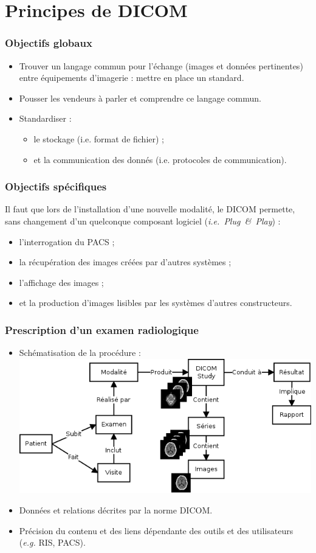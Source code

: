 \section{Principes de DICOM}

	\frame
	{
		\frametitle{Objectifs globaux}
		\begin{itemize}
			\item Trouver un langage commun pour l'\'echange (images et donn\'ees pertinentes) entre \'equipements d'imagerie : mettre en place un standard.
			\item Pousser les vendeurs \`a parler et comprendre ce langage commun.
			\item Standardiser :
			\begin{itemize}
				\item le stockage (i.e. format de fichier) ;
				\item et la communication des donn\'es (i.e. protocoles de communication).
			\end{itemize}
		\end{itemize}
	}
	
	\frame
	{
		\frametitle{Objectifs sp\'ecifiques}
		
        Il faut que lors de l'installation d'une nouvelle modalit\'e, le DICOM permette, sans changement d'un quelconque composant logiciel (\emph{i.e.~Plug~\&~Play}) :
		\begin{itemize}
			\item l'interrogation du PACS ;
			\item la r\'ecup\'eration des images cr\'e\'ees par d'autres syst\`emes ;
			\item l'affichage des images ;
			\item et la production d'images lisibles par les syst\`emes d'autres constructeurs.
		\end{itemize}
	}

	\frame
	{
		\frametitle{Prescription d'un examen radiologique}
		\begin{itemize}
			\item Sch\'ematisation de la proc\'edure :
			\includegraphics[width=\linewidth]{./figures/scenario.png}
			\item Donn\'ees et relations d\'ecrites par la norme DICOM.
			\item Pr\'ecision du contenu et des liens d\'ependante des outils et des utilisateurs (\emph{e.g.} RIS, PACS).
		\end{itemize}
	}

